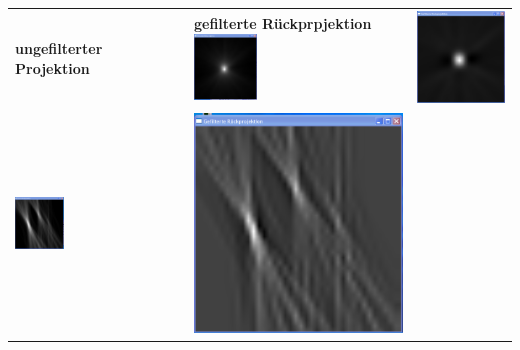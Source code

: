             \begin{longtable}{p{7cm}p{7cm}c}
                \textbf{ungefilterter Projektion} & \textbf{gefilterte Rückprpjektion} \endhead
                \includegraphics[width=0.3\textwidth, height=0.2\textheight]{pic/Einzelfenster_Bilder/unbekannte_Quelle/unbek1_einf_prj.png}
                & 
                \includegraphics[width=.3\textwidth, height=0.2\textheight]{pic/Einzelfenster_Bilder/unbekannte_Quelle/unbek1gef_prj.png}\\
                \includegraphics[width=0.3\textwidth, height=0.2\textheight]{pic/Einzelfenster_Bilder/unbekannte_Quelle/unbek2einf_prj.png}
                & 
                \includegraphics[width=.3\textwidth, height=0.2\textheight]{pic/Einzelfenster_Bilder/unbekannte_Quelle/unbek2gef_prj.png}\\ 

\end{longtable}
